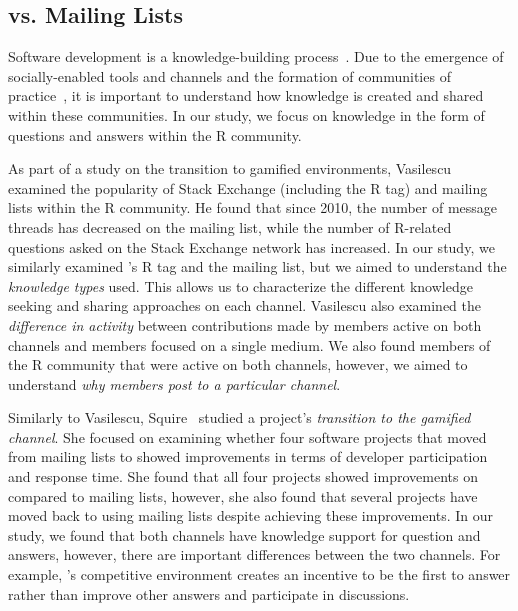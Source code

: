 \subsection{\SO vs. Mailing Lists}
Software development is a knowledge-building process~\cite{naur1985programming}. Due to the emergence of socially-enabled tools and channels and the formation of communities of practice~\cite{Storey2014}, it is important to understand how knowledge is created and shared within these communities. In our study, we focus on knowledge in the form of questions and answers within the R community.


As part of a study on the transition to gamified environments, Vasilescu~\cite{Vasi1escu2014PhD} examined the popularity of Stack Exchange (including the \SO R tag) and
mailing lists within the R community. He found that since 2010, the number of message threads has decreased on the \RH mailing list, while the number of
R-related questions asked on the Stack Exchange network has increased. In our study, we similarly examined \SO's R tag and the \RH mailing list, but we aimed to understand the \textit{knowledge types} used. This allows us to characterize the different knowledge seeking and sharing approaches on each channel. Vasilescu also examined the \textit{difference in activity} between contributions made by members active on both channels and members focused on a single medium. We also found members of the R community that were active on both channels, however, we aimed to understand \textit{why members post to a particular channel}.

Similarly to Vasilescu, Squire~\cite{Squire2015a} studied a project's \textit{transition to the \SO gamified channel}. She focused on examining whether four software projects that moved from mailing lists to \SO showed improvements in terms of developer participation and response time. She found that all four projects showed improvements on \SO compared to mailing lists, however, she also found that several projects have moved back to using mailing lists despite achieving these improvements. In our study, we found that both channels have knowledge support for question and answers, however, there are important differences between the two channels. For example, \SO's competitive environment creates an incentive to be the first to answer rather than improve other answers and participate in discussions.

